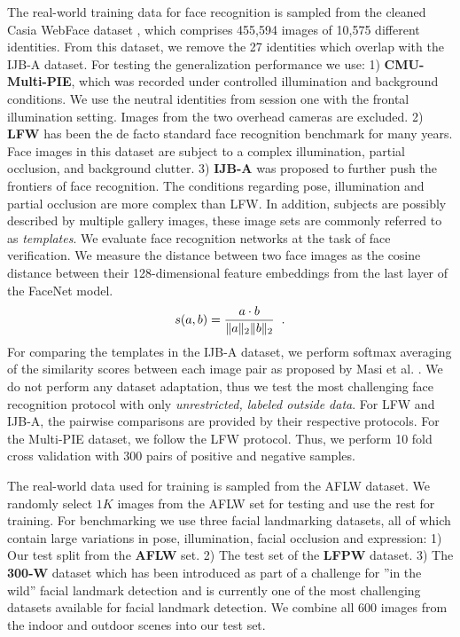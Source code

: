 \documentclass[10pt,twocolumn,letterpaper]{article}
\begin{document}
    
	The real-world training data for face recognition is sampled from the cleaned Casia WebFace dataset \cite{casia}, which comprises 455,594 images of 10,575 different identities. From this dataset, we remove the 27 identities which overlap with the IJB-A dataset. For testing the generalization performance we use: 1) \textbf{CMU-Multi-PIE}\cite{multipie}, which was recorded under controlled illumination and background conditions. We use the neutral identities from session one with the frontal illumination setting. Images from the two overhead cameras are excluded.  2) \textbf{LFW}\cite{lfw} has been the de facto standard face recognition benchmark for many years. Face images in this dataset are subject to a complex illumination, partial occlusion, and background clutter. 3) \textbf{IJB-A}\cite{ijba} was proposed to further push the frontiers of face recognition. The conditions regarding pose, illumination and partial occlusion are more complex than LFW. In addition, subjects are possibly described by multiple gallery images, these image sets are commonly referred to as \textit{templates}. 
	We evaluate face recognition networks at the task of face verification. We measure the distance between two face images as the cosine distance between their 128-dimensional feature embeddings from the last layer of the FaceNet model.
    \begin{equation}
           s(a,b)=\frac{a \cdot b}{\lVert a\rVert_2 \lVert b\rVert_2} \hspace{0.2cm}.
    \end{equation}%
    For comparing the templates in the IJB-A dataset, we perform softmax averaging of the similarity scores between each image pair as proposed by Masi et al. \cite{masi2016we}. We do not perform any dataset adaptation, thus we test the most challenging face recognition protocol with only \textit{unrestricted, labeled outside data}. For LFW and IJB-A, the pairwise comparisons are provided by their respective protocols. For the Multi-PIE dataset, we follow the LFW protocol. Thus, we perform 10 fold cross validation with 300 pairs of positive and negative samples.
    
	
	The real-world data used for training is sampled from the AFLW \cite{koestinger11a} dataset. We randomly select $1K$ images from the AFLW set for testing and use the rest for training. For benchmarking we use three facial landmarking datasets, all of which contain large variations in pose, illumination, facial occlusion and expression: 1) Our test split from the \textbf{AFLW} set. 2) The test set of the \textbf{LFPW}\cite{belhumeur2013localizing} dataset.  3) The \textbf{300-W}\cite{sagonas2013300} dataset which has been introduced as part of a challenge for ''in the wild'' facial landmark detection and is currently one of the most challenging datasets available for facial landmark detection. We combine all 600 images from the indoor and outdoor scenes into our test set.
\end{document}
